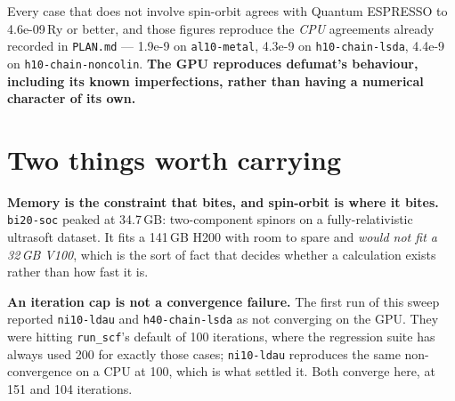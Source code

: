 \documentclass[11pt,a4paper]{article}
\begin{document}
Every case that does not involve spin-orbit agrees with Quantum ESPRESSO to
4.6e-09\,Ry or better, and those figures reproduce the \emph{CPU} agreements
already recorded in \texttt{PLAN.md} --- 1.9e-9 on \texttt{al10-metal}, 4.3e-9 on
\texttt{h10-chain-lsda}, 4.4e-9 on \texttt{h10-chain-noncolin}. \textbf{The GPU
reproduces defumat's behaviour, including its known imperfections, rather than
having a numerical character of its own.}

\section*{Two things worth carrying}

\textbf{Memory is the constraint that bites, and spin-orbit is where it bites.}
\texttt{bi20-soc} peaked at 34.7\,GB: two-component spinors on a
fully-relativistic ultrasoft dataset. It fits a 141\,GB H200 with room to spare
and \emph{would not fit a 32\,GB V100}, which is the sort of fact that decides
whether a calculation exists rather than how fast it is.

\textbf{An iteration cap is not a convergence failure.} The first run of this
sweep reported \texttt{ni10-ldau} and \texttt{h40-chain-lsda} as not converging
on the GPU. They were hitting \texttt{run\_scf}'s default of 100 iterations,
where the regression suite has always used 200 for exactly those cases;
\texttt{ni10-ldau} reproduces the same non-convergence on a CPU at 100, which is
what settled it. Both converge here, at 151 and 104 iterations.
\end{document}
